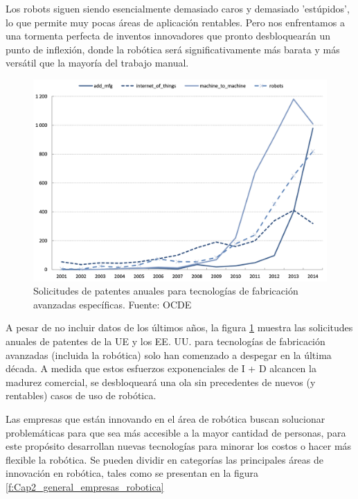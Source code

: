             \newpage
    
    Los robots siguen siendo esencialmente demasiado caros y demasiado 'estúpidos', lo que permite muy pocas áreas de aplicación rentables. Pero nos enfrentamos a una tormenta perfecta de inventos innovadores que pronto desbloquearán un punto de inflexión, donde la robótica será significativamente más barata y más versátil que la mayoría del trabajo manual.
    
    \begin{figure}[H]
        \centering
        \includegraphics[width=1\linewidth]{Main/Chapter2/Images2/solicitud-patentes.png}
        \caption{Solicitudes de patentes anuales para tecnologías de fabricación avanzadas específicas. Fuente: OCDE}
        \label{f:Cap2_general_solicitud_patentes}
    \end{figure}

     A pesar de no incluir datos de los últimos años, la figura \ref{f:Cap2_general_solicitud_patentes} muestra las solicitudes anuales de patentes de la UE y los EE. UU. para tecnologías de fabricación avanzadas (incluida la robótica) solo han comenzado a despegar en la última década. A medida que estos esfuerzos exponenciales de I + D alcancen la madurez comercial, se desbloqueará una ola sin precedentes de nuevos (y rentables) casos de uso de robótica. 
 
    Las empresas que están innovando en el área de robótica buscan solucionar problemáticas para que sea más accesible a la mayor cantidad de personas, para este propósito desarrollan nuevas tecnologías para minorar los costos o hacer más flexible la robótica. Se pueden dividir en categorías las principales áreas de innovación en robótica, tales como se presentan en la figura \ref{f:Cap2_general_empresas_robotica}

